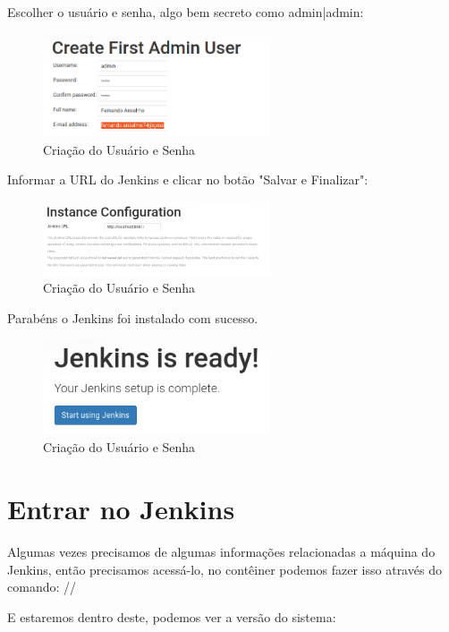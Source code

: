\documentclass[a4paper,11pt]{article}
\begin{document}
Escolher o usuário e senha, algo bem secreto como admin|admin:
\begin{figure}[H]
	\centering
	\includegraphics[width=0.6\textwidth]{imagens/i3CriarSenha.png}
	\caption{Criação do Usuário e Senha}
\end{figure}

Informar a URL do Jenkins e clicar no botão "Salvar e Finalizar":
\begin{figure}[H]
	\centering
	\includegraphics[width=0.6\textwidth]{imagens/i4ConfirmaUrl.png}
	\caption{Criação do Usuário e Senha}
\end{figure}

Parabéns o Jenkins foi instalado com sucesso.
\begin{figure}[H]
	\centering
	\includegraphics[width=0.6\textwidth]{imagens/i5Parabens.png}
	\caption{Criação do Usuário e Senha}
\end{figure}

\section{Entrar no Jenkins}
Algumas vezes precisamos de algumas informações relacionadas a máquina do Jenkins, então precisamos acessá-lo, no contêiner podemos fazer isso através do comando: //

E estaremos dentro deste, podemos ver a versão do sistema:
\end{document}
